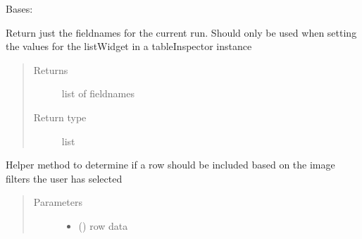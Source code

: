 \documentclass[letterpaper,10pt,english]{sphinxmanual}
\begin{document}
\begin{fulllineitems}
\label{\detokenize{polo.widgets:polo.widgets.table_viewer.TableViewer}}
Bases: 

\begin{fulllineitems}
\label{\detokenize{polo.widgets:polo.widgets.table_viewer.TableViewer.fieldnames}}
Return just the fieldnames for the current run. Should only be
used when setting the values for the listWidget in a tableInspector
instance
\begin{quote}\begin{description}
\item[{Returns}] \leavevmode
list of fieldnames

\item[{Return type}] \leavevmode
list

\end{description}\end{quote}

\end{fulllineitems}


\begin{fulllineitems}
\label{\detokenize{polo.widgets:polo.widgets.table_viewer.TableViewer.filter}}
Helper method to determine if a row should be included based on
the image filters the user has selected
\begin{quote}\begin{description}
\item[{Parameters}] \leavevmode\begin{itemize}
\item {} 
 () \textendash{} row data


\end{itemize}
\end{description}
\end{quote}
\end{fulllineitems}
\end{fulllineitems}
\end{document}
